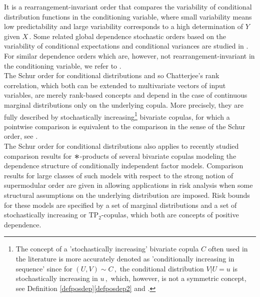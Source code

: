 \documentclass{article}
\newcommand{\TP}{\mathrm{TP_2}}
\newcommand{\conv}{{\scalebox{1.5}{\raisebox{-0.2ex}{$\ast$}}}}
\begin{document}
It is a rearrangement-invariant order that compares the variability of conditional distribution functions in the conditioning variable, where small variability means low predictability and large variability corresponds to a high determination of \(Y\) given \(X\,.\)
Some related global dependence stochastic orders based on the variability of conditional expectations and conditional variances are studied in \cite{Shaked-2013}. For similar dependence orders which are, however, not rearrangement-invariant in the conditioning variable, we refer to \cite{Averous-2000,Colangelo-2008,dette2013copula,Hollander-1990,Joe-2018,Yanagimoto-1969}.\\
The Schur order for conditional distributions and so Chatterjee's rank correlation, which both can be extended to multivariate vectors of input variables, 
are merely rank-based concepts and depend in the case of continuous marginal distributions only on the underlying copula.
More precisely, they are
fully described by stochastically increasing\footnote{The concept of a 'stochastically increasing' bivariate copula \(C\) often used in the literature is more accurately denoted as 'conditionally increasing in sequence' since for \((U,V)\sim C\,,\) the conditional distribution \(V|U=u\) is stochastically increasing in \(u\,,\) which, however, is not a symmetric concept, see Definition \ref{defposdep}\eqref{defposdep2} and \cite{Mueller-Stoyan-2002}.} 
bivariate copulas, for which a pointwise comparison is equivalent to the comparison in the sense of the Schur order, see \cite[Proposition 3.4]{Ansari-Fuchs-2022}. \\
The Schur order for conditional distributions also applies to recently studied comparison results for \(\conv\)-products of several bivariate copulas modeling the dependence structure of conditionally independent factor models.
Comparison results for large classes of such models with respect to the strong notion of supermodular order are given in \cite{Ansari-Rueschendorf-2022} allowing applications in risk analysis when some structural assumptions on the underlying distribution are imposed.
Risk bounds for these models are specified by a set of marginal distributions and a set of stochastically increasing or \(\TP\)-copulas, which both are concepts of positive dependence. \\
\end{document}
